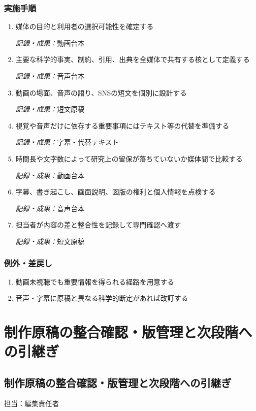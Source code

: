 \documentclass[a4paper,11pt]{article}
\begin{document}
\subsubsection*{実施手順}
\begin{enumerate}[leftmargin=2em,itemsep=0.65em]
\item 媒体の目的と利用者の選択可能性を確定する\par\noindent\textit{記録・成果：}動画台本\nobreak\smallskip
\item 主要な科学的事実、制約、引用、出典を全媒体で共有する核として定義する\par\noindent\textit{記録・成果：}音声台本\nobreak\smallskip
\item 動画の場面、音声の語り、SNSの短文を個別に設計する\par\noindent\textit{記録・成果：}短文原稿\nobreak\smallskip
\item 視覚や音声だけに依存する重要事項にはテキスト等の代替を準備する\par\noindent\textit{記録・成果：}字幕・代替テキスト\nobreak\smallskip
\item 時間長や文字数によって研究上の留保が落ちていないか媒体間で比較する\par\noindent\textit{記録・成果：}動画台本\nobreak\smallskip
\item 字幕、書き起こし、画面説明、図版の権利と個人情報を点検する\par\noindent\textit{記録・成果：}音声台本\nobreak\smallskip
\item 担当者が内容の差と整合性を記録して専門確認へ渡す\par\noindent\textit{記録・成果：}短文原稿\nobreak\smallskip
\end{enumerate}
\subsubsection*{例外・差戻し}
\begin{enumerate}[leftmargin=2em,itemsep=0.35em]
\item 動画未視聴でも重要情報を得られる経路を用意する
\item 音声・字幕に原稿と異なる科学的断定があれば改訂する
\end{enumerate}
\section{制作原稿の整合確認・版管理と次段階への引継ぎ}
\subsection{制作原稿の整合確認・版管理と次段階への引継ぎ}
\par 担当：編集責任者\par\medskip
\end{document}
